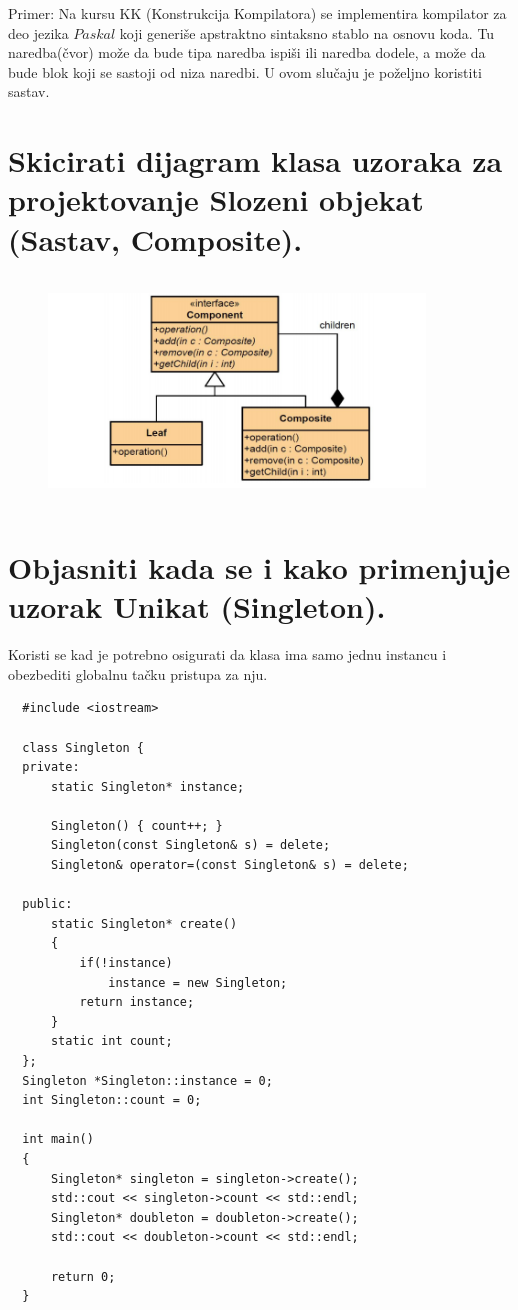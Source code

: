 \documentclass[a4paper]{article}
\begin{document}
  Primer: Na kursu KK (Konstrukcija Kompilatora) se implementira kompilator 
  za deo jezika $Paskal$ koji generiše apstraktno sintaksno stablo na osnovu koda. Tu naredba(čvor) 
  može da bude tipa naredba ispiši ili naredba dodele, a može da bude blok koji 
  se sastoji od niza naredbi. U ovom slučaju je poželjno koristiti sastav. 

\section{Skicirati dijagram klasa uzoraka za projektovanje Slozeni objekat (Sastav, Composite).}
  \begin{figure}[H]
    \begin{center}
        \includegraphics[width=100mm,height=60mm]{Slike/dp_composite.png}
    \end{center}
  \end{figure}   

\section{Objasniti kada se i kako primenjuje uzorak Unikat (Singleton).}
  Koristi se kad je potrebno osigurati da klasa ima samo jednu instancu i obezbediti globalnu 
  tačku pristupa za nju.

\begin{lstlisting}
  #include <iostream>

  class Singleton {
  private:
      static Singleton* instance;
  
      Singleton() { count++; }
      Singleton(const Singleton& s) = delete;
      Singleton& operator=(const Singleton& s) = delete;
  
  public:
      static Singleton* create()
      {
          if(!instance)
              instance = new Singleton;
          return instance;
      }
      static int count;
  };
  Singleton *Singleton::instance = 0;
  int Singleton::count = 0;
  
  int main()
  {
      Singleton* singleton = singleton->create();
      std::cout << singleton->count << std::endl;
      Singleton* doubleton = doubleton->create();
      std::cout << doubleton->count << std::endl;
  
      return 0;
  }\end{lstlisting}
\end{document}
